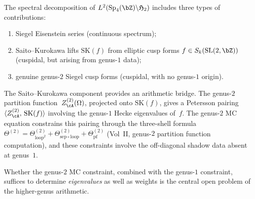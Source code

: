 \begin{remark}%
\label{rem:saito-kurokawa-bridge}%
%
The spectral decomposition of
$L^2(\mathrm{Sp}_4(\bZ) \backslash \mathfrak{H}_2)$
includes three types of contributions:
\begin{enumerate}[label=\textup{(\roman*)}]
\item Siegel Eisenstein series (continuous spectrum);
\item Saito--Kurokawa lifts $\mathrm{SK}(f)$ from elliptic
 cusp forms $f \in S_k(\mathrm{SL}(2,\bZ))$ (cuspidal,
 but arising from genus-$1$ data);
\item genuine genus-$2$ Siegel cusp forms (cuspidal,
 with no genus-$1$ origin).
\end{enumerate}
The Saito--Kurokawa component provides an arithmetic bridge.
The genus-$2$ partition function~$Z_\cA^{(2)}(\Omega)$,
projected onto $\mathrm{SK}(f)$, gives a Petersson pairing
$\langle Z_\cA^{(2)},\, \mathrm{SK}(f) \rangle$
involving the genus-$1$ Hecke eigenvalues of~$f$.
The genus-$2$ MC equation constrains this pairing through the
three-shell formula
$\Theta^{(2)} = \Theta^{(2)}_{\mathrm{loop}^2}
+ \Theta^{(2)}_{\mathrm{sep}\circ\mathrm{loop}}
+ \Theta^{(2)}_{\mathrm{pf}}$
(Vol~II, genus-$2$ partition function computation),
and these constraints involve the off-diagonal
shadow data absent at genus~$1$.

Whether the genus-$2$ MC constraint, combined with the
genus-$1$ constraint, suffices to determine \emph{eigenvalues}
as well as weights is the central open problem of the
higher-genus arithmetic.
\end{remark}

